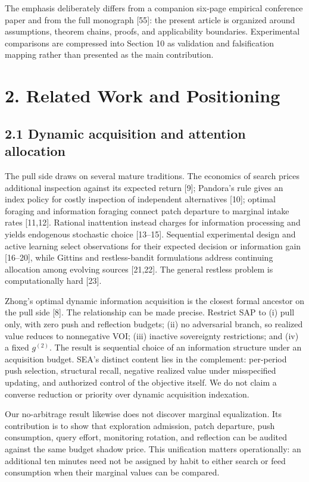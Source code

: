 \documentclass[
  11pt]{article}
\begin{document}
The emphasis deliberately differs from a companion six-page empirical conference paper and from the full monograph {[}55{]}: the present article is organized around assumptions, theorem chains, proofs, and applicability boundaries. Experimental comparisons are compressed into Section 10 as validation and falsification mapping rather than presented as the main contribution.

\section{2. Related Work and Positioning}\label{related-work-and-positioning}

\subsection{2.1 Dynamic acquisition and attention allocation}\label{dynamic-acquisition-and-attention-allocation}

The pull side draws on several mature traditions. The economics of search prices additional inspection against its expected return {[}9{]}; Pandora's rule gives an index policy for costly inspection of independent alternatives {[}10{]}; optimal foraging and information foraging connect patch departure to marginal intake rates {[}11,12{]}. Rational inattention instead charges for information processing and yields endogenous stochastic choice {[}13--15{]}. Sequential experimental design and active learning select observations for their expected decision or information gain {[}16--20{]}, while Gittins and restless-bandit formulations address continuing allocation among evolving sources {[}21,22{]}. The general restless problem is computationally hard {[}23{]}.

Zhong's optimal dynamic information acquisition is the closest formal ancestor on the pull side {[}8{]}. The relationship can be made precise. Restrict SAP to (i) pull only, with zero push and reflection budgets; (ii) no adversarial branch, so realized value reduces to nonnegative VOI; (iii) inactive sovereignty restrictions; and (iv) a fixed \(g^{(2)}\). The result is sequential choice of an information structure under an acquisition budget. SEA's distinct content lies in the complement: per-period push selection, structural recall, negative realized value under misspecified updating, and authorized control of the objective itself. We do not claim a converse reduction or priority over dynamic acquisition indexation.

Our no-arbitrage result likewise does not discover marginal equalization. Its contribution is to show that exploration admission, patch departure, push consumption, query effort, monitoring rotation, and reflection can be audited against the same budget shadow price. This unification matters operationally: an additional ten minutes need not be assigned by habit to either search or feed consumption when their marginal values can be compared.
\end{document}
